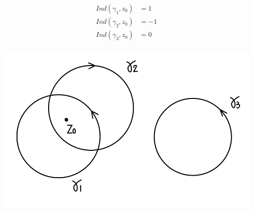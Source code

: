 \documentclass[11pt]{article}
\begin{document}
\iffalse
\begin{minipage}{.5\textwidth}
       \begin{align*}
	Ind(\gamma_1, z_0) &= 1 \\
	Ind(\gamma_2, z_0) &= -1 \\
	Ind(\gamma_3, z_0) &= 0 \\
	\end{align*}
  \end{minipage}%
  \begin{minipage}{.5\textwidth}
    \centering
    \includegraphics[scale = 0.2]{22_4}
\end{minipage} 
\end{document}
